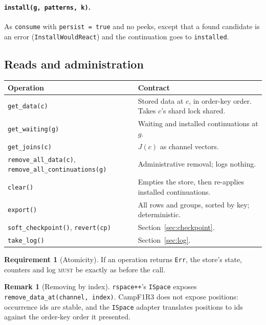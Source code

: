 \documentclass[11pt]{article}
\theoremstyle{plain}
\theoremstyle{definition}
\newtheorem{requirement}{Requirement}
\newtheorem{remark}[proposition]{Remark}
\newcommand{\Camp}{CampF1R3}
\newcommand{\MUST}{\textsc{must}}
\newcommand{\code}[1]{\texttt{#1}}
\begin{document}
\paragraph{\code{install(g, patterns, k)}.} As \code{consume} with
\code{persist = true} and no peeks, except that a found candidate is an error
(\code{InstallWouldReact}) and the continuation goes to \code{installed}.

\subsection{Reads and administration}

\begin{center}
\begin{tabularx}{\linewidth}{@{}lX@{}}
\toprule
Operation & Contract\\
\midrule
\code{get\_data(c)} & Stored data at $c$, in order-key order. Takes $c$'s shard lock shared.\\
\code{get\_waiting(g)} & Waiting and installed continuations at $g$.\\
\code{get\_joins(c)} & $J(c)$ as channel vectors.\\
\code{remove\_all\_data(c)}, \code{remove\_all\_continuations(g)} & Administrative removal; logs nothing.\\
\code{clear()} & Empties the store, then re-applies installed continuations.\\
\code{export()} & All rows and groups, sorted by key; deterministic.\\
\code{soft\_checkpoint()}, \code{revert(cp)} & Section~\ref{sec:checkpoint}.\\
\code{take\_log()} & Section~\ref{sec:log}.\\
\bottomrule
\end{tabularx}
\end{center}

\begin{requirement}[Atomicity]
If an operation returns \code{Err}, the store's state, counters and log \MUST{} be
exactly as before the call.
\end{requirement}

\begin{remark}[Removing by index]
\code{rspace++}'s \code{ISpace} exposes \code{remove\_data\_at(channel, index)}. \Camp{}
does not expose positions: occurrence ids are stable, and the \code{ISpace} adapter
translates positions to ids against the order-key order it presented.
\end{remark}
\end{document}
